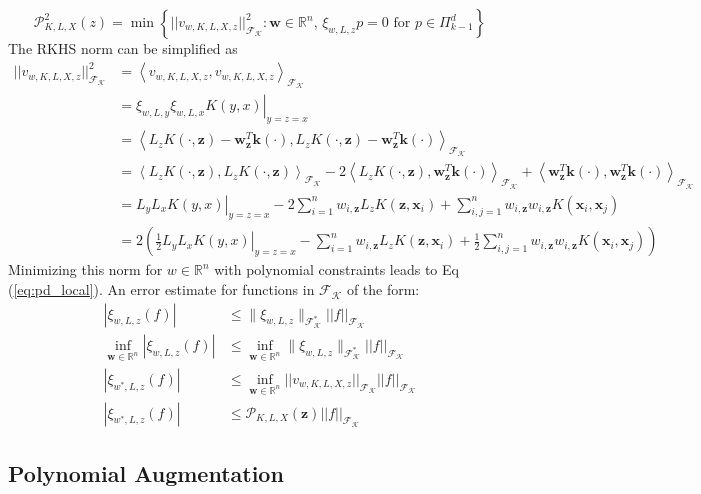 \documentclass[11pt]{article}
\begin{document}
\begin{equation}
\mathcal{P}_{K,L,X}^2(z) = \min \left \{||v_{w,K,L,X,z}||_\mathcal{F_K}^2: \bm{w}\in \mathbb{R}^n \text{, } \xi_{w,L,z} p = 0 \text{ for } p \in \Pi_{k-1}^d \right \}
\end{equation}
The RKHS norm can be simplified as
\begin{align*}
	||v_{w,K,L,X,z}||_\mathcal{F_K}^2 &= \left\langle v_{w,K,L,X,z}, v_{w,K,L,X,z} \right\rangle_{\mathcal{F_K}}\\
	&= \left. \xi_{w,L,y} \xi_{w,L,x} K(y,x) \right|_{y=z=x}\\
	&= \left\langle L_z K(\cdot, \bm{z}) - \bm{w}^T_{\bm{z}} \bm{k}(\cdot), L_z K(\cdot, \bm{z}) - \bm{w}^T_{\bm{z}} \bm{k}(\cdot) \right\rangle_{\mathcal{F_K}}\\
	&= \left\langle L_z K(\cdot, \bm{z}), L_z K(\cdot, \bm{z}) \right\rangle_{\mathcal{F_K}} - 2 \left\langle L_z K(\cdot, \bm{z}) , \bm{w}^T_{\bm{z}} \bm{k}(\cdot) \right\rangle_{\mathcal{F_K}} \allowbreak{} + \left\langle \bm{w}^T_{\bm{z}} \bm{k}(\cdot), \bm{w}^T_{\bm{z}} \bm{k}(\cdot) \right\rangle_{\mathcal{F_K}}\\
	&= \left. L_y L_x K(y,x) \right|_{y=z=x} - 2 \sum_{i=1}^n w_{i,\bm{z}} L_z K(\bm{z}, \bm{x}_i) + \sum_{i,j=1}^n w_{i,\bm{z}}w_{i,\bm{z}} K(\bm{x}_i, \bm{x}_j)\\
	&= 2 \left( \frac{1}{2} \left. L_y L_x K(y,x) \right|_{y=z=x} - \sum_{i=1}^n w_{i,\bm{z}} L_z K(\bm{z}, \bm{x}_i) + \frac{1}{2}\sum_{i,j=1}^n w_{i,\bm{z}}w_{i,\bm{z}} K(\bm{x}_i, \bm{x}_j) \right)
\end{align*}
Minimizing this norm for $w \in \mathbb{R}^n$ with polynomial constraints leads to Eq (\ref{eq:pd_local}). An error estimate for functions in $\mathcal{F_K}$ of the form:
\begin{align*}
	|\xi_{w,L,z}(f)| &\le \| \xi_{w,L,z} \|_\mathcal{F_K^*} ||f||_\mathcal{F_K} \\
	\inf_{\bm{w}\in \mathbb{R}^n} |\xi_{w,L,z}(f)| &\le \inf_{\bm{w}\in \mathbb{R}^n} \| \xi_{w,L,z} \|_\mathcal{F_K^*} ||f||_\mathcal{F_K}\\	
	|\xi_{w^*,L,z}(f)| &\le \inf_{\bm{w}\in \mathbb{R}^n} ||v_{w,K,L,X,z}||_\mathcal{F_K} ||f||_\mathcal{F_K}\\
	|\xi_{w^*,L,z}(f)| &\le \mathcal{P}_{K,L,X}(\bm{z}) ||f||_\mathcal{F_K}
\end{align*}

\pagebreak

\subsection{Polynomial Augmentation}
\end{document}
